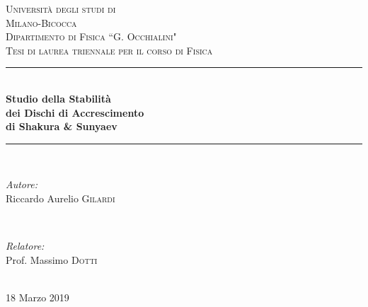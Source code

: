 \documentclass[a4paperbi]{article}
\newcommand{\HRule}{\rule{\linewidth}{0.5mm}} %
\begin{document}
\begin{titlepage}
\center %
\textsc{\LARGE Università degli studi di}\\[0.1cm]
\textsc{\LARGE Milano-Bicocca}\\[1.2cm] %
\textsc{\Large Dipartimento di Fisica ``G. Occhialini"}\\[0.5cm] %
\textsc{\large Tesi di laurea triennale per il corso di Fisica}\\[0.5cm] %
\HRule \\[0.4cm]
{ \huge \bfseries Studio della Stabilità}\\[0.1cm]
{ \huge \bfseries dei Dischi di Accrescimento}\\[0.1cm]
{ \huge \bfseries  di Shakura \& Sunyaev}\\[0.4cm] %
\HRule \\[1.5cm]
\begin{minipage}{0.4\textwidth}
\begin{flushleft} \large
\emph{Autore:}\\
Riccardo Aurelio \textsc{Gilardi} %
\end{flushleft}
\end{minipage}
~
\begin{minipage}{0.4\textwidth}
\begin{flushright} \large
\emph{Relatore:} \\
Prof. Massimo \textsc{Dotti} %
\end{flushright}
\end{minipage}\\[2cm]
{\large 18 Marzo 2019}\\[1cm] %

\end{titlepage}
\end{document}
